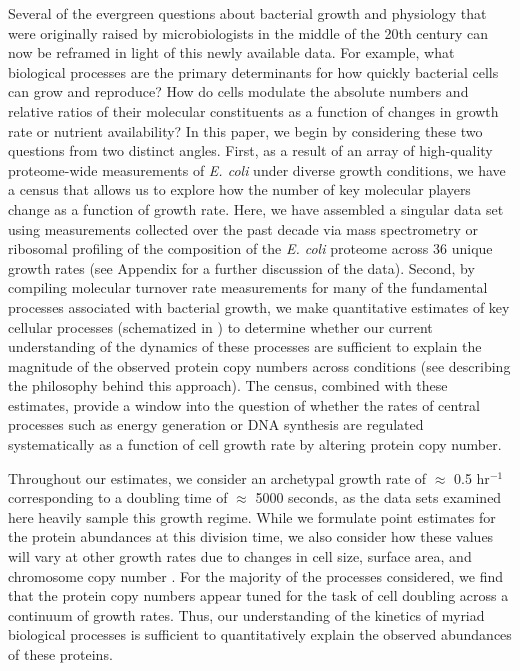 Several of the evergreen questions about bacterial growth and physiology that
were originally raised by microbiologists in the middle of the 20th century
can now be reframed in light of this newly available data. For example, what
biological processes are the primary determinants for how quickly bacterial
cells can grow and reproduce? How do cells modulate the absolute numbers and
relative ratios of their molecular constituents as a function of changes in
growth rate or nutrient availability? In this paper, we begin by considering these two
questions from two distinct angles. First, as a result of an array of
high-quality proteome-wide measurements of \textit{E. coli} under diverse
growth conditions, we have a census that allows us to explore how the number
of key molecular players change as a function of growth rate. Here, we have
assembled a singular data set using measurements collected over the past
decade via mass spectrometry \citep{schmidt2016, peebo2015, valgepea2013} or
ribosomal profiling \citep{li2014} of the composition of the \textit{E. coli}
proteome across 36 unique growth rates (see Appendix
 for a further discussion of the data). Second, by
compiling molecular turnover rate measurements for many of the fundamental
processes associated with bacterial growth, we make quantitative estimates of
key cellular processes (schematized in ) to determine whether
our current understanding of the dynamics of these processes are sufficient
to explain the magnitude of the observed protein copy numbers across
conditions (see  describing the philosophy behind this approach). The census, combined with these estimates, provide a window into
the question of whether the rates of central processes such as energy
generation or DNA synthesis are regulated systematically as a function of
cell growth rate by altering protein copy number.

Throughout our estimates, we consider an archetypal growth rate of $\approx$ 0.5
hr$^{-1}$ corresponding to a doubling time of $\approx$ 5000 seconds, as the
data sets examined here heavily sample this growth regime. While we formulate
point estimates for the protein abundances at this division time, we also
consider how these values will vary at other growth rates due to changes in cell
size, surface area, and chromosome copy number \citep{taheriaraghi2015,
harris2018}. For the majority of the processes considered, we find that the
protein copy numbers appear tuned for the task of cell doubling across a
continuum of growth rates. Thus, our understanding of the kinetics of myriad
biological processes is sufficient to quantitatively explain the observed
abundances of these proteins.

